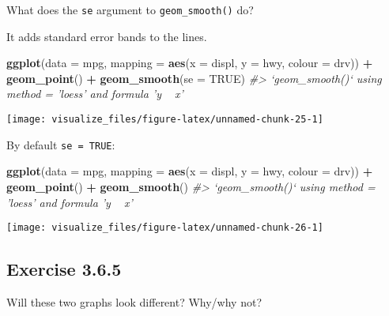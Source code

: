 \documentclass[]{book}
\newenvironment{Shaded}{\begin{snugshade}}{\end{snugshade}}
\newcommand{\CommentTok}[1]{\textcolor[rgb]{0.56,0.35,0.01}{\textit{#1}}}
\newcommand{\DataTypeTok}[1]{\textcolor[rgb]{0.13,0.29,0.53}{#1}}
\newcommand{\KeywordTok}[1]{\textcolor[rgb]{0.13,0.29,0.53}{\textbf{#1}}}
\newcommand{\NormalTok}[1]{#1}
\newcommand{\OperatorTok}[1]{\textcolor[rgb]{0.81,0.36,0.00}{\textbf{#1}}}
\newcommand{\OtherTok}[1]{\textcolor[rgb]{0.56,0.35,0.01}{#1}}
\newcommand{\StringTok}[1]{\textcolor[rgb]{0.31,0.60,0.02}{#1}}
\theoremstyle{plain}
\theoremstyle{remark}
\theoremstyle{definition}
\theoremstyle{definition}
\theoremstyle{definition}
\theoremstyle{remark}
\begin{document}
What does the \texttt{se} argument to \texttt{geom\_smooth()} do?

It adds standard error bands to the lines.

\begin{Shaded}
\begin{Highlighting}[]
\KeywordTok{ggplot}\NormalTok{(}\DataTypeTok{data =}\NormalTok{ mpg, }\DataTypeTok{mapping =} \KeywordTok{aes}\NormalTok{(}\DataTypeTok{x =}\NormalTok{ displ, }\DataTypeTok{y =}\NormalTok{ hwy, }\DataTypeTok{colour =}\NormalTok{ drv)) }\OperatorTok{+}
\StringTok{  }\KeywordTok{geom_point}\NormalTok{() }\OperatorTok{+}
\StringTok{  }\KeywordTok{geom_smooth}\NormalTok{(}\DataTypeTok{se =} \OtherTok{TRUE}\NormalTok{)}
\CommentTok{#> `geom_smooth()` using method = 'loess' and formula 'y ~ x'}
\end{Highlighting}
\end{Shaded}

\begin{center}\texttt{[image: visualize\_files/figure-latex/unnamed-chunk-25-1]} \end{center}

By default \texttt{se\ =\ TRUE}:

\begin{Shaded}
\begin{Highlighting}[]
\KeywordTok{ggplot}\NormalTok{(}\DataTypeTok{data =}\NormalTok{ mpg, }\DataTypeTok{mapping =} \KeywordTok{aes}\NormalTok{(}\DataTypeTok{x =}\NormalTok{ displ, }\DataTypeTok{y =}\NormalTok{ hwy, }\DataTypeTok{colour =}\NormalTok{ drv)) }\OperatorTok{+}
\StringTok{  }\KeywordTok{geom_point}\NormalTok{() }\OperatorTok{+}
\StringTok{  }\KeywordTok{geom_smooth}\NormalTok{()}
\CommentTok{#> `geom_smooth()` using method = 'loess' and formula 'y ~ x'}
\end{Highlighting}
\end{Shaded}

\begin{center}\texttt{[image: visualize\_files/figure-latex/unnamed-chunk-26-1]} \end{center}

\hypertarget{exercise-3.6.5}{%
\subsection*{\texorpdfstring{Exercise
{3.6.5}}{Exercise 3.6.5}}\label{exercise-3.6.5}}

Will these two graphs look different? Why/why not?
\end{document}
